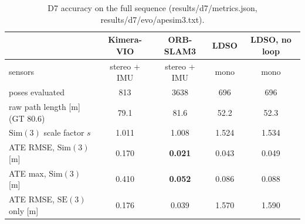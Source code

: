 \documentclass[11pt,a4paper]{article}
\DeclareRobustCommand{\code}[1]{\begingroup\ttfamily\codebreaks#1\endgroup}
\newcommand{\codebreaks}{\renewcommand{\_}{\textunderscore\allowbreak}}
\begin{document}
\begin{table}[tbp]
\centering\small
\begin{tabular}{lcccc}
\toprule
 & Kimera-VIO & ORB-SLAM3 & LDSO & LDSO, no loop \\
\midrule
sensors & stereo + IMU & stereo + IMU & mono & mono \\
poses evaluated & 813 & 3638 & 696 & 696 \\
raw path length [m] (GT 80.6) & 79.1 & 81.6 & 52.2 & 52.3 \\
$\mathrm{Sim}(3)$ scale factor $s$ & 1.011 & 1.008 & 1.524 & 1.534 \\
ATE RMSE, $\mathrm{Sim}(3)$ [m] & 0.170 & \textbf{0.021} & 0.043 & 0.049 \\
ATE max, $\mathrm{Sim}(3)$ [m] & 0.410 & \textbf{0.052} & 0.086 & 0.088 \\
ATE RMSE, $\mathrm{SE}(3)$ only [m] & 0.176 & 0.039 & 1.570 & 1.590 \\
\bottomrule
\end{tabular}
\caption{D7 accuracy on the full sequence (\code{results/d7/metrics.json},
\code{results/d7/evo/ape\_*\_sim3.txt}).}
\label{tab:d7}
\end{table}
\end{document}
